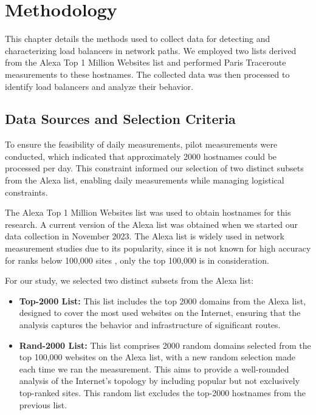 \documentclass[12pt]{cwru_thesis}
\begin{document}
\chapter{Methodology}

This chapter details the methods used to collect data for detecting and characterizing load balancers in network paths. We employed two lists derived from the Alexa Top 1 Million Websites list and performed Paris Traceroute measurements to these hostnames. The collected data was then processed to identify load balancers and analyze their behavior.

\section{Data Sources and Selection Criteria}

To ensure the feasibility of daily measurements, pilot measurements were conducted, which indicated that approximately 2000 hostnames could be processed per day. This constraint informed our selection of two distinct subsets from the Alexa list, enabling daily measurements while managing logistical constraints.

The Alexa Top 1 Million Websites list was used to obtain hostnames for this research. A current version of the Alexa list was obtained when we started our data collection in November 2023. The Alexa list is widely used in network measurement studies due to its popularity, since it is not known for high accuracy for ranks below 100,000 sites  \cite{alexa2023top1m}, only the top 100,000 is in consideration.

For our study, we selected two distinct subsets from the Alexa list:
\begin{itemize}
    \item \textbf{Top-2000 List:} This list includes the top 2000 domains from the Alexa list, designed to cover the most used websites on the Internet, ensuring that the analysis captures the behavior and infrastructure of significant routes.
    \item \textbf{Rand-2000 List:} This list comprises 2000 random domains selected from the top 100,000 websites on the Alexa list, with a new random selection made each time we ran the measurement. This aims to provide a well-rounded analysis of the Internet's topology by including popular but not exclusively top-ranked sites. This random list excludes the top-2000 hostnames from the previous list.
\end{itemize}
\end{document}
